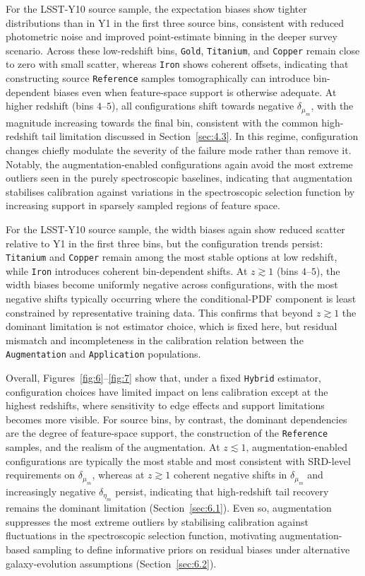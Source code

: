 For the LSST-Y10 source sample, the expectation biases show tighter distributions than in Y1 in the first three source bins, consistent with reduced photometric noise and improved point-estimate binning in the deeper survey scenario. Across these low-redshift bins, \texttt{Gold}, \texttt{Titanium}, and \texttt{Copper} remain close to zero with small scatter, whereas \texttt{Iron} shows coherent offsets, indicating that constructing source \texttt{Reference} samples tomographically can introduce bin-dependent biases even when feature-space support is otherwise adequate. At higher redshift (bins \(4\)--\(5\)), all configurations shift towards negative \(\delta_{\mu_m}\), with the magnitude increasing towards the final bin, consistent with the common high-redshift tail limitation discussed in Section~\ref{sec:4.3}. In this regime, configuration changes chiefly modulate the severity of the failure mode rather than remove it. Notably, the augmentation-enabled configurations again avoid the most extreme outliers seen in the purely spectroscopic baselines, indicating that augmentation stabilises calibration against variations in the spectroscopic selection function by increasing support in sparsely sampled regions of feature space.

For the LSST-Y10 source sample, the width biases again show reduced scatter relative to Y1 in the first three bins, but the configuration trends persist: \texttt{Titanium} and \texttt{Copper} remain among the most stable options at low redshift, while \texttt{Iron} introduces coherent bin-dependent shifts. At \(z \gtrsim 1\) (bins \(4\)--\(5\)), the width biases become uniformly negative across configurations, with the most negative shifts typically occurring where the conditional-PDF component is least constrained by representative training data. This confirms that beyond \(z \gtrsim 1\) the dominant limitation is not estimator choice, which is fixed here, but residual mismatch and incompleteness in the calibration relation between the \texttt{Augmentation} and \texttt{Application} populations.

Overall, Figures~\ref{fig:6}--\ref{fig:7} show that, under a fixed \texttt{Hybrid} estimator, configuration choices have limited impact on lens calibration except at the highest redshifts, where sensitivity to edge effects and support limitations becomes more visible. For source bins, by contrast, the dominant dependencies are the degree of feature-space support, the construction of the \texttt{Reference} samples, and the realism of the augmentation. At \(z \lesssim 1\), augmentation-enabled configurations are typically the most stable and most consistent with SRD-level requirements on \(\delta_{\mu_m}\), whereas at \(z \gtrsim 1\) coherent negative shifts in \(\delta_{\mu_m}\) and increasingly negative \(\delta_{\eta_m}\) persist, indicating that high-redshift tail recovery remains the dominant limitation (Section~\ref{sec:6.1}). Even so, augmentation suppresses the most extreme outliers by stabilising calibration against fluctuations in the spectroscopic selection function, motivating augmentation-based sampling to define informative priors on residual biases under alternative galaxy-evolution assumptions (Section~\ref{sec:6.2}).